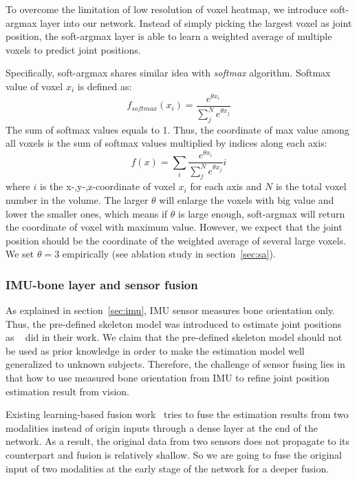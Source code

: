 \documentclass[10pt,twocolumn,letterpaper]{article}
\begin{document}
To overcome the limitation of low resolution of voxel heatmap, we introduce soft-argmax layer into our network. Instead of simply picking the largest voxel as joint position, the soft-argmax layer is able to learn a weighted average of multiple voxels to predict joint positions. 

Specifically, soft-argmax shares similar idea with \textit{softmax} algorithm. Softmax value of voxel $x_i$ is defined as:
\begin{equation}
\label{equa:sm}
    f_{softmax}(x_i)=\frac{e^{\theta x_i}}{\sum_j^Ne^{\theta x_j}}
\end{equation}
The sum of softmax values equals to 1. Thus, the coordinate of max value among all voxels is the sum of softmax values multiplied by indices along each axis: \begin{equation}
    \label{equa:sam}
     f(x)=\sum_i\frac{e^{\theta x_i}}{\sum_j^Ne^{\theta x_j}}i
\end{equation}
where $i$ is the x-,y-,z-coordinate of voxel $x_i$ for each axis and $N$ is the total voxel number in the volume. The larger $\theta$ will enlarge the voxels with big value and lower the smaller ones, which means if $\theta$ is large enough, soft-argmax will return the coordinate of voxel with maximum value. However, we expect that the joint position should be the coordinate of the weighted average of several large voxels. We set $\theta=3$ empirically (see ablation study in section~\ref{sec:sa}).



\vspace{-0.4cm}
\subsubsection{IMU-bone layer and sensor fusion}
\label{sec:ib}
As explained in section~\ref{sec:imu}, IMU sensor measures bone orientation only. Thus, the pre-defined skeleton model was introduced to estimate joint positions as ~\cite{von2018recovering,trumble2017total,von2016human} did in their work. We claim that the pre-defined skeleton model should not be used as prior knowledge in order to make the estimation model well generalized to unknown subjects. Therefore, the challenge of sensor fusing lies in that how to use measured bone orientation from IMU to refine joint position estimation result from vision. 

Existing learning-based fusion work~\cite{trumble2017total} tries to fuse the estimation results from two modalities instead of origin inputs through a dense layer at the end of the network. As a result, the original data from two sensors does not propagate to its counterpart and fusion is relatively shallow. So we are going to fuse the original input of two modalities at the early stage of the network for a deeper fusion.
\end{document}
